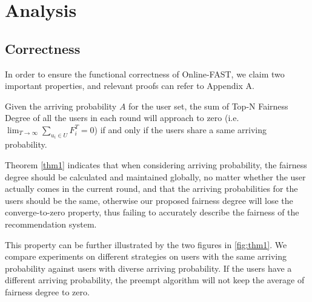 \section{Analysis}


\subsection{Correctness}

In order to ensure the functional correctness of Online-FAST, we claim two important properties, and relevant proofs can refer to Appendix A.

\begin{theorem} Given the arriving probability $A$ for the user set, the sum of Top-N Fairness Degree of all the users in each round will approach to zero (i.e.  $\lim_{T \rightarrow \infty}\sum_{u_{i} \in U} F_{i}^{T}=0$) if and only if the users share a same arriving probability.
\label{thm1}
\end{theorem}

Theorem \ref{thm1} indicates that when considering arriving probability, the fairness degree should be calculated and maintained globally, no matter whether the user actually comes in the current round, and that the arriving probabilities for the users should be the same, otherwise our proposed fairness degree will lose the converge-to-zero property, thus failing to accurately describe the fairness of the recommendation system.

This property can be further illustrated by the two figures in \ref{fig:thm1}. We compare experiments on different strategies on users with the same arriving probability against users with diverse arriving probability. If the users have a different arriving probability, the preempt algorithm will not keep the average of fairness degree to zero.

